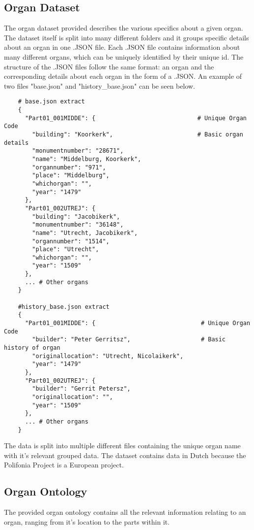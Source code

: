 \subsection{Organ Dataset}
\hspace{0.5cm} The organ dataset provided describes the various specifics about a given organ. The dataset itself is split into many different folders and it groups specific details about an organ in one .JSON file. Each .JSON file contains information about many different organs, which can be uniquely identified by their unique id. The structure of the .JSON files follow the same format: an organ and the corresponding details about each organ in the form of a .JSON. An example of two files "base.json" and "history\_base.json" can be seen below. 

\begin{lstlisting}
    # base.json extract
    {
      "Part01_001MIDDE": {                             # Unique Organ Code
        "building": "Koorkerk",                        # Basic organ details
        "monumentnumber": "28671",
        "name": "Middelburg, Koorkerk",
        "organnumber": "971",
        "place": "Middelburg",
        "whichorgan": "",
        "year": "1479"
      },
      "Part01_002UTREJ": {
        "building": "Jacobikerk",
        "monumentnumber": "36148",
        "name": "Utrecht, Jacobikerk",
        "organnumber": "1514",
        "place": "Utrecht",
        "whichorgan": "",
        "year": "1509"
      },
      ... # Other organs
    }

    #history_base.json extract
    {
      "Part01_001MIDDE": {                              # Unique Organ Code
        "builder": "Peter Gerritsz",                    # Basic history of organ
        "originallocation": "Utrecht, Nicolaikerk",
        "year": "1479"
      },
      "Part01_002UTREJ": {
        "builder": "Gerrit Petersz",
        "originallocation": "",
        "year": "1509"
      },
      ... # Other organs
    }
\end{lstlisting}

The data is split into multiple different files containing the unique organ name with it's relevant grouped data. The dataset contains data in Dutch because the Polifonia Project is a European project.

\subsection{Organ Ontology}
\hspace{0.5cm} The provided organ ontology contains all the relevant information relating to an organ, ranging from it's location to the parts within it. 

